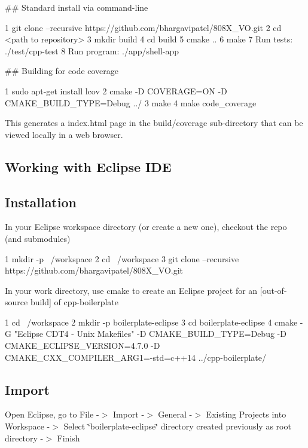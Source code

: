 \#\# Standard install via command-\/line 
\begin{DoxyCode}
1 git clone --recursive https://github.com/bhargavipatel/808X\_VO.git
2 cd <path to repository>
3 mkdir build
4 cd build
5 cmake ..
6 make
7 Run tests: ./test/cpp-test
8 Run program: ./app/shell-app
\end{DoxyCode}


\#\# Building for code coverage 
\begin{DoxyCode}
1 sudo apt-get install lcov
2 cmake -D COVERAGE=ON -D CMAKE\_BUILD\_TYPE=Debug ../
3 make
4 make code\_coverage
\end{DoxyCode}
 This generates a index.\+html page in the build/coverage sub-\/directory that can be viewed locally in a web browser.

\subsection*{Working with Eclipse I\+DE}

\subsection*{Installation}

In your Eclipse workspace directory (or create a new one), checkout the repo (and submodules) 
\begin{DoxyCode}
1 mkdir -p ~/workspace
2 cd ~/workspace
3 git clone --recursive https://github.com/bhargavipatel/808X\_VO.git
\end{DoxyCode}


In your work directory, use cmake to create an Eclipse project for an \mbox{[}out-\/of-\/source build\mbox{]} of cpp-\/boilerplate


\begin{DoxyCode}
1 cd ~/workspace
2 mkdir -p boilerplate-eclipse
3 cd boilerplate-eclipse
4 cmake -G "Eclipse CDT4 - Unix Makefiles" -D CMAKE\_BUILD\_TYPE=Debug -D CMAKE\_ECLIPSE\_VERSION=4.7.0 -D
       CMAKE\_CXX\_COMPILER\_ARG1=-std=c++14 ../cpp-boilerplate/
\end{DoxyCode}


\subsection*{Import}

Open Eclipse, go to File -\/$>$ Import -\/$>$ General -\/$>$ Existing Projects into Workspace -\/$>$ Select \char`\"{}boilerplate-\/eclipse\char`\"{} directory created previously as root directory -\/$>$ Finish


